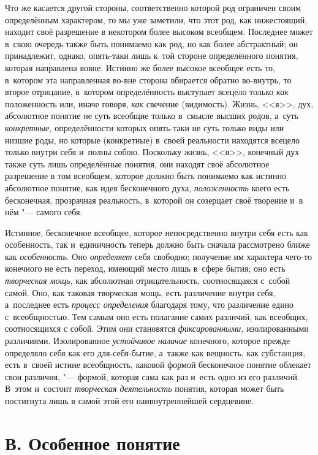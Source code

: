 Что же касается другой стороны, соответственно которой род
ограничен своим определённым характером, то мы уже заметили, что
этот род, как нижестоящий, находит своё разрешение в
некотором более высоком всеобщем. Последнее может в~свою очередь также быть
понимаемо как род, но как более абстрактный; он принадлежит, однако,
опять-таки лишь к~той стороне определённого понятия, которая направлена
вовне. Истинно же более высокое всеобщее есть то, в~котором эта
направленная во-вне сторона вбирается обратно во-внутрь, то второе
отрицание, в~котором определённость выступает всецело только
{\em как} положенность
или, иначе говоря, {\em как}
свечение (видимость). Жизнь, <<я>>, дух, абсолютное понятие не
суть всеобщие только в~смысле высших родов, а~суть
{\em конкретные,}
определённости которых опять-таки не суть только виды или
низшие роды, но которые (конкретные) в~своей реальности находятся всецело
только внутри себя и~полны собою. Поскольку жизнь, <<я>>, конечный дух также
суть лишь определённые понятия, они находят своё абсолютное разрешение в
том всеобщем, которое должно быть понимаемо как истинно абсолютное понятие,
как идея бесконечного духа,
{\em положенность} коего
есть бесконечная, прозрачная реальность, в~которой он созерцает своё
творение и~в нём "--- самого себя.

Истинное, бесконечное всеобщее, которое непосредственно внутри
себя есть как особенность, так и~единичность теперь должно быть сначала
рассмотрено ближе как
{\em особенность}. Оно
{\em определяет} себя
свободно; получение им характера чего-то конечного не есть переход, имеющий
место лишь в~сфере бытия; оно есть
{\em творческая мощь,}
как абсолютная отрицательность, соотносящаяся с~собой самой.
Оно, как таковая творческая мощь, есть различение внутри себя, а~последнее
есть {\em процесс определения}
благодаря тому, что различение едино с~всеобщностью. Тем
самым оно есть полагание самих различий, как всеобщих, соотносящихся с
собой. Этим они становятся
{\em фиксированными,}
изолированными различиями. Изолированное
{\em устойчивое наличие}
конечного, которое прежде определяло себя как его
для-себя-бытие, а~также как вещность, как субстанция, есть в~своей истине
всеобщность, каковой формой бесконечное понятие облекает свои различия, "---
формой, которая сама как раз и~есть одно из его различий.
В~этом и~состоит {\em творческая
деятельность} понятия, которая может быть постигнута лишь в
самой этой его наивнутреннейшей сердцевине.

\section[В. Особенное понятие]{В. Особенное понятие}

